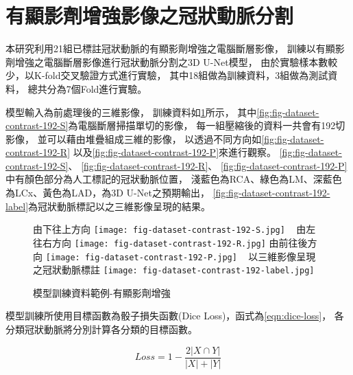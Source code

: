 \documentclass[class=NCU_thesis, crop=false]{standalone}
\begin{document}
\section{有顯影劑增強影像之冠狀動脈分割}

本研究利用21組已標註冠狀動脈的有顯影劑增強之電腦斷層影像，
訓練以有顯影劑增強之電腦斷層影像進行冠狀動脈分割之3D U-Net模型，
由於實驗樣本數較少，以K-fold交叉驗證方式進行實驗，
其中18組做為訓練資料，3組做為測試資料，
總共分為7個Fold進行實驗。

模型輸入為前處理後的三維影像，
訓練資料如\cref{fig:fig-dataset-contrast-input-example}所示，
其中\cref{fig:fig-dataset-contrast-192-S}為電腦斷層掃描單切的影像，
每一組壓縮後的資料一共會有192切影像，
並可以藉由堆疊組成三維的影像，
以透過不同方向如\cref{fig:fig-dataset-contrast-192-R}
以及\cref{fig:fig-dataset-contrast-192-P}來進行觀察。
\cref{fig:fig-dataset-contrast-192-S}、
\cref{fig:fig-dataset-contrast-192-R}、
\cref{fig:fig-dataset-contrast-192-P}
中有顏色部分為人工標記的冠狀動脈位置，
淺藍色為RCA、綠色為LM、深藍色為LCx、黃色為LAD，為3D U-Net之預期輸出，
\cref{fig:fig-dataset-contrast-192-label}為冠狀動脈標記以之三維影像呈現的結果。
\begin{figure}[!hbt]
    \centering
    \subcaptionbox
        {由下往上方向
        \label{fig:fig-dataset-contrast-192-S}}
        {\texttt{[image: fig-dataset-contrast-192-S.jpg]}}
    ~
    \subcaptionbox
        {由左往右方向
        \label{fig:fig-dataset-contrast-192-R}}
        {\texttt{[image: fig-dataset-contrast-192-R.jpg]}}
    \vspace{\baselineskip} %
    \subcaptionbox
        {由前往後方向
        \label{fig:fig-dataset-contrast-192-P}}
        {\texttt{[image: fig-dataset-contrast-192-P.jpg]}}
    ~
    \subcaptionbox
        {以三維影像呈現之冠狀動脈標註
        \label{fig:fig-dataset-contrast-192-label}}
        {\texttt{[image: fig-dataset-contrast-192-label.jpg]}}
    \caption{模型訓練資料範例-有顯影劑增強}
    \label{fig:fig-dataset-contrast-input-example}
\end{figure}

模型訓練所使用目標函數為骰子損失函數(Dice Loss)，函式為\cref{eqn:dice-loss}，
各分類冠狀動脈將分別計算各分類的目標函數。

\begin{equation}
\label{eqn:dice-loss}
Loss = 1-\frac{2|X\cap Y|}{|X|+|Y|} 
\end{equation}
\end{document}
